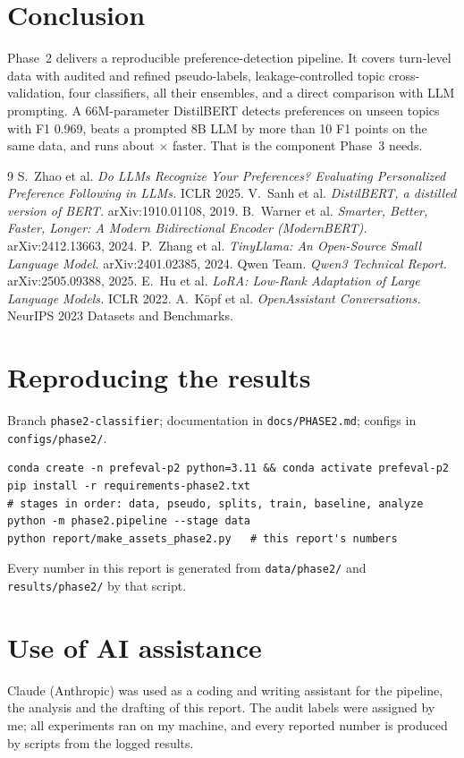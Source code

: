 \documentclass[11pt,a4paper]{article}
\begin{document}
\section{Conclusion}
Phase~2 delivers a reproducible preference-detection pipeline. It covers turn-level data with audited and refined pseudo-labels, leakage-controlled
topic cross-validation, four classifiers, all their ensembles, and a direct comparison with LLM prompting. A 66M-parameter DistilBERT
detects preferences on unseen topics with F1 0.969, beats a prompted 8B LLM by more than 10 F1 points on the same data, and runs about
\pSpeedup$\times$ faster. That is the component Phase~3 needs.

\begin{thebibliography}{9}\small
{} S.~Zhao et al. \emph{Do LLMs Recognize Your Preferences? Evaluating Personalized Preference Following in LLMs.} ICLR 2025.
 V.~Sanh et al. \emph{DistilBERT, a distilled version of BERT.} arXiv:1910.01108, 2019.
 B.~Warner et al. \emph{Smarter, Better, Faster, Longer: A Modern Bidirectional Encoder (ModernBERT).} arXiv:2412.13663, 2024.
 P.~Zhang et al. \emph{TinyLlama: An Open-Source Small Language Model.} arXiv:2401.02385, 2024.
 Qwen Team. \emph{Qwen3 Technical Report.} arXiv:2505.09388, 2025.
 E.~Hu et al. \emph{LoRA: Low-Rank Adaptation of Large Language Models.} ICLR 2022.
 A.~K\"opf et al. \emph{OpenAssistant Conversations.} NeurIPS 2023 Datasets and Benchmarks.
\end{thebibliography}

\appendix
\section{Reproducing the results}
Branch \nolinkurl{phase2-classifier}; documentation in \nolinkurl{docs/PHASE2.md}; configs in \nolinkurl{configs/phase2/}.
\begin{verbatim}
conda create -n prefeval-p2 python=3.11 && conda activate prefeval-p2
pip install -r requirements-phase2.txt
# stages in order: data, pseudo, splits, train, baseline, analyze
python -m phase2.pipeline --stage data
python report/make_assets_phase2.py   # this report's numbers
\end{verbatim}
Every number in this report is generated from \nolinkurl{data/phase2/} and \nolinkurl{results/phase2/} by that script.

\section{Use of AI assistance}
Claude (Anthropic) was used as a coding and writing assistant for the pipeline, the analysis and the drafting of this report. The audit labels
were assigned by me; all experiments ran on my machine, and every reported number is produced by scripts from the logged results.
\end{document}
